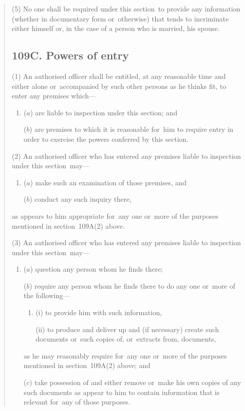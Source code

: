 \documentclass[12pt,a4paper]{article}
\begin{document}
\begin{quotation}
(5) No one shall be required under this section~to provide any information (whether in documentary form or~otherwise) that tends to incriminate either himself or, in the case of a person who is married, his spouse.

\subsection*{109C. Powers of entry}

(1) An authorised officer shall be entitled, at any reasonable time and either alone or~accompanied by such other persons as he thinks fit, to enter any premises which—
\begin{enumerate}\item[]
($a$) are liable to inspection under this section; and

($b$) are premises to which it is reasonable for~him to require entry in order to exercise the powers conferred by this section.
\end{enumerate}

(2) An authorised officer who has entered any premises liable to inspection under this section~may—
\begin{enumerate}\item[]
($a$) make such an examination of those premises, and

($b$) conduct any such inquiry there,
\end{enumerate}
as appears to him appropriate for~any one or~more of the purposes mentioned in section~109A(2)  above.

(3) An authorised officer who has entered any premises liable to inspection under this section~may—
\begin{enumerate}\item[]
($a$) question any person whom he finds there;

($b$) require any person whom he finds there to do any one or~more of the following—
\begin{enumerate}\item[]
(i) to provide him with such information,

(ii) to produce and deliver up and (if necessary) create such documents or~such copies of, or~extracts from, documents,
\end{enumerate}
as he may reasonably require for~any one or~more of the purposes mentioned in section~109A(2)  above; and

($c$) take possession of and either remove or~make his own copies of any such documents as appear to him to contain information that is relevant for~any of those purposes.
\end{enumerate}


\end{quotation}
\end{document}
